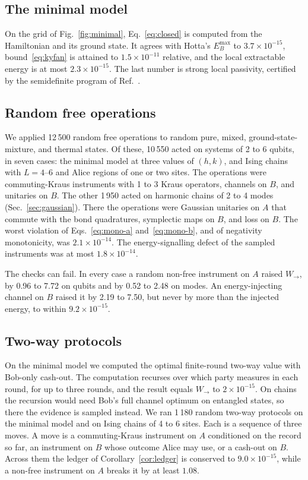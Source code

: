 \documentclass[aps,pra,twocolumn,reprint,superscriptaddress,nofootinbib,floatfix]{revtex4-2}
\theoremstyle{plain}
\theoremstyle{remark}
\newcommand{\Wto}{W_{\to}}
\begin{document}
\subsection{The minimal model}

On the grid of Fig.~\ref{fig:minimal}, Eq.~\eqref{eq:closed} is computed from the
Hamiltonian and its ground state. It agrees with Hotta's $E_B^{\max}$ to $3.7\times10^{-15}$,
bound~\eqref{eq:kyfan} is attained to $1.5\times10^{-11}$ relative, and the local
extractable energy is at most $2.3\times10^{-15}$. The last number is strong local passivity,
certified by the semidefinite program of Ref.~\cite{Alhambra2019}.

\subsection{Random free operations}

We applied 12\,500 random free operations to random pure, mixed, ground-state-mixture, and
thermal states. Of these, 10\,550 acted on systems of 2 to 6 qubits, in seven cases: the
minimal model at three values of $(h,k)$, and Ising chains with $L=4$--$6$ and Alice regions
of one or two sites. The operations were commuting-Kraus instruments with 1 to 3 Kraus
operators, channels on $B$, and unitaries on $B$. The other 1\,950 acted on harmonic chains of
2 to 4 modes (Sec.~\ref{sec:gaussian}). There the operations were Gaussian unitaries on $A$
that commute with the bond quadratures, symplectic maps on $B$, and loss on $B$. The worst
violation of Eqs.~\eqref{eq:mono-a} and~\eqref{eq:mono-b}, and of negativity monotonicity,
was $2.1\times10^{-14}$. The energy-signalling defect of the sampled instruments was at most
$1.8\times10^{-14}$.

The checks can fail. In every case a random non-free instrument on $A$ raised $\Wto$, by
0.96 to 7.72 on qubits and by 0.52 to 2.48 on modes. An energy-injecting channel on $B$ raised
it by 2.19 to 7.50, but never by more than the injected energy, to within $9.2\times10^{-15}$.

\subsection{Two-way protocols}

On the minimal model we computed the optimal finite-round two-way value with Bob-only
cash-out. The computation recurses over which party measures in each round, for up to three
rounds, and the result equals $\Wto$ to $2\times10^{-15}$. On chains the recursion would need
Bob's full channel optimum on entangled states, so there the evidence is sampled instead. We
ran 1\,180 random two-way protocols on the minimal model and on Ising chains of 4 to 6 sites.
Each is a sequence of three moves. A move is a commuting-Kraus instrument on $A$ conditioned
on the record so far, an instrument on $B$ whose outcome Alice may use, or a cash-out on $B$.
Across them the ledger of Corollary~\ref{cor:ledger} is conserved to $9.0\times10^{-15}$,
while a non-free instrument on $A$ breaks it by at least $1.08$.
\end{document}
